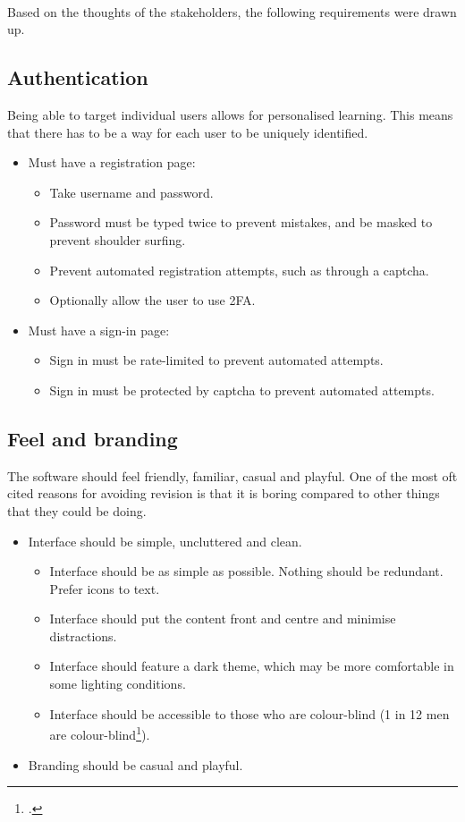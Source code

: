 \documentclass{report}
\begin{document}
\paragraph{}
Based on the thoughts of the stakeholders, the following requirements were drawn up.

\subsection{Authentication}
Being able to target individual users allows for personalised learning. This means that there has to be a way for each user to be uniquely identified.
\begin{itemize}
  \item Must have a registration page:
  \begin{itemize}
    \item Take username and password.
    \item Password must be typed twice to prevent mistakes, and be masked to prevent shoulder surfing.
    \item Prevent automated registration attempts, such as through a captcha.
    \item Optionally allow the user to use 2FA.
  \end{itemize}
  \item Must have a sign-in page:
  \begin{itemize}
    \item Sign in must be rate-limited to prevent automated attempts.
    \item Sign in must be protected by captcha to prevent automated attempts.
  \end{itemize}
\end{itemize}

\subsection{Feel and branding}
The software should feel friendly, familiar, casual and playful. One of the most oft cited reasons for avoiding revision is that it is boring compared to other things that they could be doing.
\begin{itemize}
  \item Interface should be simple, uncluttered and clean.
  \begin{itemize}
    \item Interface should be as simple as possible. Nothing should be redundant. Prefer icons to text.
    \item Interface should put the content front and centre and minimise distractions.
    \item Interface should feature a dark theme, which may be more comfortable in some lighting conditions.
    \item Interface should be accessible to those who are colour-blind (1 in 12 men are colour-blind\footcite{Colourblindness}).
  \end{itemize}
  \item Branding should be casual and playful.
\end{itemize}
\end{document}
